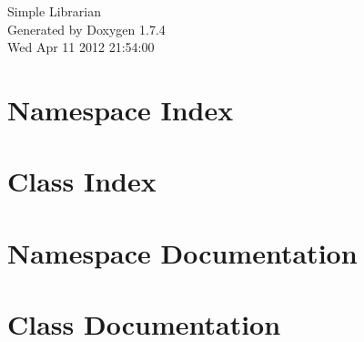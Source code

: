 \documentclass[a4paper]{book}
\begin{document}
\hypersetup{pageanchor=false}
\begin{titlepage}
\vspace*{7cm}
\begin{center}
{\Large Simple Librarian }\\
\vspace*{1cm}
{\large Generated by Doxygen 1.7.4}\\
\vspace*{0.5cm}
{\small Wed Apr 11 2012 21:54:00}\\
\end{center}
\end{titlepage}
\clearemptydoublepage
{}
\tableofcontents
\clearemptydoublepage
{}
\hypersetup{pageanchor=true}
\chapter{Namespace Index}

\chapter{Class Index}

\chapter{Namespace Documentation}

\chapter{Class Documentation}















\printindex
\end{document}
